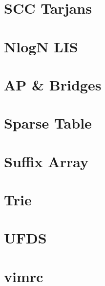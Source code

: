 \documentclass[twocolumn]{article}
\begin{document}
{    \section{SCC Tarjans}
    

    \newpage

    \section{NlogN LIS}
    
    \section{AP \& Bridges}
    
    \section{Sparse Table}
    

    \newpage

    \section{Suffix Array}
    
    \section{Trie}
    
    \section{UFDS}
    

    \newpage

    \section{vimrc}
    
}
\end{document}
